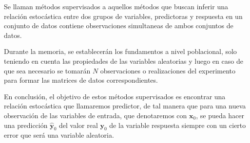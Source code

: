 \begin{defi}
Se llaman métodos supervisados \cite{Mahesh 2020} a aquellos métodos que buscan inferir una relación estocástica entre dos grupos de variables, predictoras y respuesta en un conjunto de datos contiene observaciones simultaneas de ambos conjuntos de datos. 
\end{defi}

\noindent Durante la memoria, se establecerán los fundamentos a nivel poblacional, solo teniendo en cuenta las propiedades de las variables aleatorias y luego en caso de que sea necesario se tomarán $N$ observaciones o realizaciones del experimento para formar las matrices de datos correspondientes. 

\noindent En conclusión, el objetivo de estos métodos supervisados es encontrar una relación estocástica que llamaremos predictor, de tal manera que para una nueva observación de las variables de entrada, que denotaremos con $\textbf{x}_0$, se pueda hacer una predicción $\hat{\textbf{y}}_0$ del valor real $\textbf{y}_0$ de la variable respuesta siempre con un cierto error que será una variable  aleatoria. 
 
